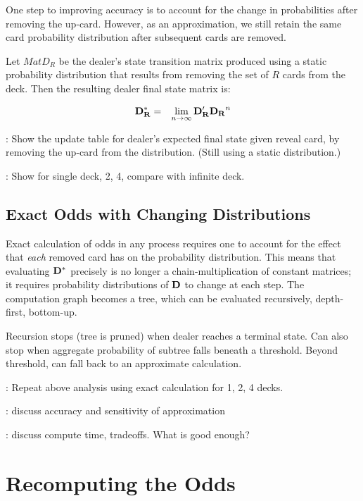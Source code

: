 One step to improving accuracy is to account for
the change in probabilities after removing the up-card.
However, as an approximation, we still retain the same 
card probability distribution after subsequent cards are removed. 

Let $Mat{D_{R}}$ be the dealer's state transition matrix produced
using a static probability distribution that results from
removing the set of $R$ cards from the deck.  
Then the resulting dealer final state matrix is:

\begin{eqnarray}
\mathbf{D_R^*} &=& \lim_{n\rightarrow{}\infty}{\mathbf{D_R^\prime}\mathbf{D_R}^n}
\end{eqnarray}

\TODO:
Show the update table for dealer's expected final state
given reveal card, by removing the up-card from the distribution.
(Still using a static distribution.)  

\TODO:
Show for single deck, 2, 4, compare with infinite deck.

\subsection{Exact Odds with Changing Distributions}
\label{sec:counting:dealer-up:exact}

Exact calculation of odds in any process requires
one to account for the effect that \emph{each} removed card has
on the probability distribution.  
This means that evaluating $\mathbf{D^*}$ precisely is no longer
a chain-multiplication of constant matrices; 
it requires probability distributions of $\mathbf{D}$ to change
at each step.
The computation graph becomes a tree, which can be evaluated
recursively, depth-first, bottom-up.

Recursion stops (tree is pruned) when
dealer reaches a terminal state.
Can also stop when aggregate probability of subtree
falls beneath a threshold.
Beyond threshold, can fall back to an approximate calculation.

\TODO:
Repeat above analysis using exact calculation for 1, 2, 4 decks.  

\TODO:
discuss accuracy and sensitivity of approximation

\TODO:
discuss compute time, tradeoffs.  What is good enough?

\section{Recomputing the Odds}
\label{sec:counting:odds}

